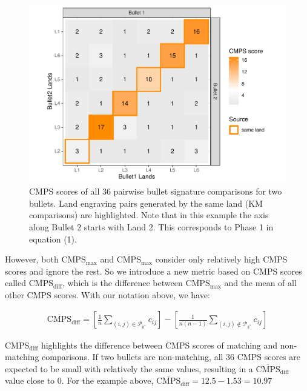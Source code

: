 \begin{Schunk}
\begin{figure}

{\centering \includegraphics[width=.7\textwidth]{ju-hofmann_files/figure-latex/tiles-1} 

}

\caption[CMPS scores of all 36 pairwise bullet signature comparisons for two bullets]{CMPS scores of all 36 pairwise bullet signature comparisons for two bullets. Land engraving pairs generated by the same land (KM comparisons) are highlighted. Note that in this example the axis along Bullet 2 starts with Land 2. This corresponds to Phase 1 in equation (1).}\label{fig:tiles}
\end{figure}
\end{Schunk}

However, both \(\mathrm{CMPS_{max}}\) and
\(\mathrm{\overline{CMPS}_{max}}\) consider only relatively high CMPS
scores and ignore the rest. So we introduce a new metric based on CMPS
scores called \(\mathrm{\overline{CMPS}_{diff}}\), which is the
difference between \(\mathrm{\overline{CMPS}_{max}}\) and the mean of
all other CMPS scores. With our notation above, we have:

\begin{align}
\mathrm{\overline{CMPS}_{diff}} = \left[  \frac{1}{n} \sum_{(i,j) \in \mathcal{P}_{k^*}} c_{ij}\right] - \left[  \frac{1}{n\left(n-1\right)} \sum_{(i,j) \notin \mathcal{P}_{k^*}} c_{ij}\right]
\end{align}

\(\mathrm{\overline{CMPS}_{diff}}\) highlights the difference between
CMPS scores of matching and non-matching comparisons. If two bullets are
non-matching, all 36 CMPS scores are expected to be small with
relatively the same values, resulting in a
\(\mathrm{\overline{CMPS}_{diff}}\) value close to 0. For the example
above, \(\mathrm{\overline{CMPS}_{diff}} = 12.5 - 1.53 = 10.97\)

